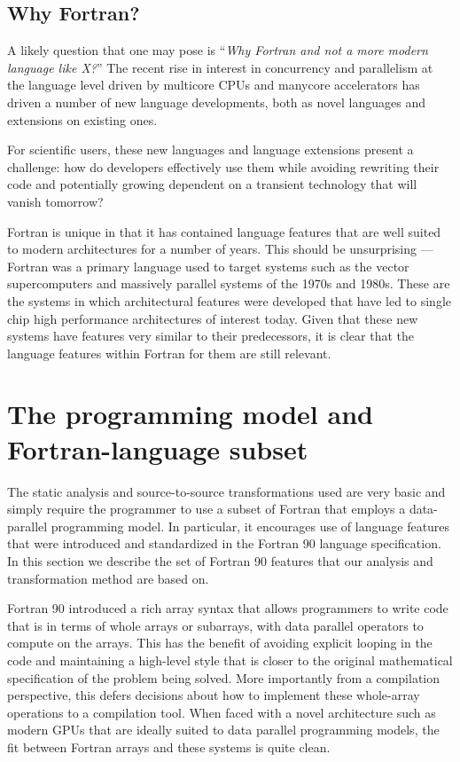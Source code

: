 \documentclass[10pt, conference, compsocconf]{IEEEtran}
\begin{document}
\subsection{Why Fortran?}

A likely question that one may pose is ``\emph{Why Fortran and not a
  more modern language like X?}''  The recent rise in interest in
concurrency and parallelism at the language level driven by multicore
CPUs and manycore accelerators has driven a number of new language
developments, both as novel languages and extensions on existing ones.

For scientific users, these new languages and language extensions
present a challenge: how do developers effectively use them while
avoiding rewriting their code and potentially growing dependent on a
transient technology that will vanish tomorrow?

Fortran is unique in that it has contained language features that are
well suited to modern architectures for a number of years.  This
should be unsurprising --- Fortran was a primary language used to
target systems such as the vector supercomputers and massively
parallel systems of the 1970s and 1980s.  These are the systems in
which architectural features were developed that have led to single
chip high performance architectures of interest today.  Given that
these new systems have features very similar to their predecessors, it
is clear that the language features within Fortran for them are still
relevant.


\section{The programming model and Fortran-language subset}

The static analysis and source-to-source transformations used are very
basic and simply require the programmer to use a subset of Fortran
that employs a data-parallel programming model.  In particular, it
encourages use of language features that were introduced and
standardized in the Fortran 90 language specification.  In this
section we describe the set of Fortran 90 features that our analysis
and transformation method are based on.

Fortran 90 introduced a rich array syntax that allows programmers to
write code that is in terms of whole arrays or subarrays, with data
parallel operators to compute on the arrays.  This has the benefit of
avoiding explicit looping in the code and maintaining a high-level
style that is closer to the original mathematical specification of the
problem being solved.  More importantly from a compilation
perspective, this defers decisions about how to implement these
whole-array operations to a compilation tool.  When faced with a novel
architecture such as modern GPUs that are ideally suited to data parallel
programming models, the fit between Fortran arrays and these systems is
quite clean.
\end{document}
